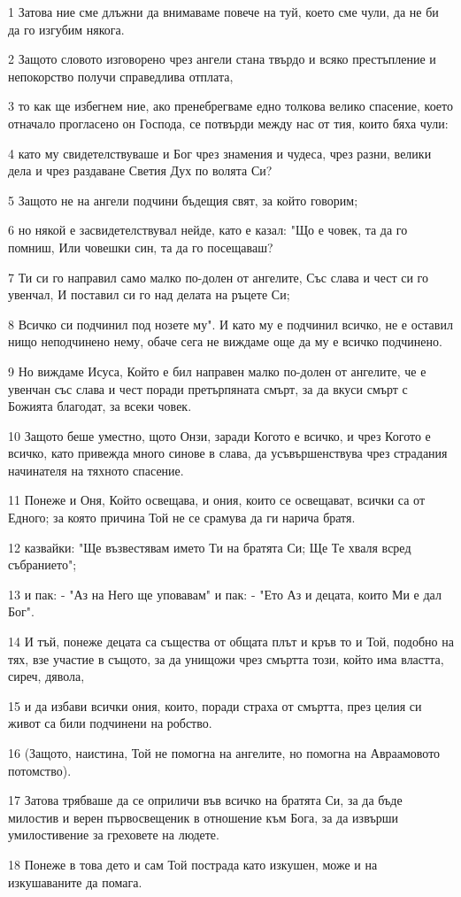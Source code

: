 \par 1 Затова ние сме длъжни да внимаваме повече на туй, което сме чули, да не би да го изгубим някога.
\par 2 Защото словото изговорено чрез ангели стана твърдо и всяко престъпление и непокорство получи справедлива отплата,
\par 3 то как ще избегнем ние, ако пренебрегваме едно толкова велико спасение, което отначало прогласено он Господа, се потвърди между нас от тия, които бяха чули:
\par 4 като му свидетелствуваше и Бог чрез знамения и чудеса, чрез разни, велики дела и чрез раздаване Светия Дух по волята Си?
\par 5 Защото не на ангели подчини бъдещия свят, за който говорим;
\par 6 но някой е засвидетелствувал нейде, като е казал: "Що е човек, та да го помниш, Или човешки син, та да го посещаваш?
\par 7 Ти си го направил само малко по-долен от ангелите, Със слава и чест си го увенчал, И поставил си го над делата на ръцете Си;
\par 8 Всичко си подчинил под нозете му". И като му е подчинил всичко, не е оставил нищо неподчинено нему, обаче сега не виждаме още да му е всичко подчинено.
\par 9 Но виждаме Исуса, Който е бил направен малко по-долен от ангелите, че е увенчан със слава и чест поради претърпяната смърт, за да вкуси смърт с Божията благодат, за всеки човек.
\par 10 Защото беше уместно, щото Онзи, заради Когото е всичко, и чрез Когото е всичко, като привежда много синове в слава, да усъвършенствува чрез страдания начинателя на тяхното спасение.
\par 11 Понеже и Оня, Който освещава, и ония, които се освещават, всички са от Едного; за която причина Той не се срамува да ги нарича братя.
\par 12 казвайки: "Ще възвестявам името Ти на братята Си; Ще Те хваля всред събранието";
\par 13 и пак: - "Аз на Него ще уповавам" и пак: - "Ето Аз и децата, които Ми е дал Бог".
\par 14 И тъй, понеже децата са същества от общата плът и кръв то и Той, подобно на тях, взе участие в същото, за да унищожи чрез смъртта този, който има властта, сиреч, дявола,
\par 15 и да избави всички ония, които, поради страха от смъртта, през целия си живот са били подчинени на робство.
\par 16 (Защото, наистина, Той не помогна на ангелите, но помогна на Авраамовото потомство).
\par 17 Затова трябваше да се оприличи във всичко на братята Си, за да бъде милостив и верен първосвещеник в отношение към Бога, за да извърши умилостивение за греховете на людете.
\par 18 Понеже в това дето и сам Той пострада като изкушен, може и на изкушаваните да помага.

